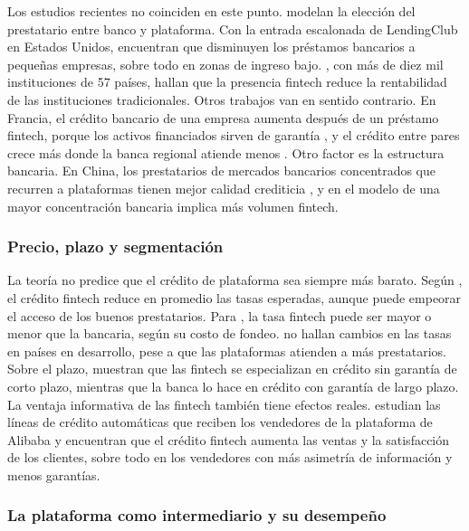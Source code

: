 Los estudios recientes no coinciden en este punto. \textcite{kim2026} modelan la elección del prestatario entre banco y plataforma. Con la entrada escalonada de LendingClub en Estados Unidos, encuentran que disminuyen los préstamos bancarios a pequeñas empresas, sobre todo en zonas de ingreso bajo. \textcite{bennaceur2026}, con más de diez mil instituciones de 57 países, hallan que la presencia fintech reduce la rentabilidad de las instituciones tradicionales. Otros trabajos van en sentido contrario. En Francia, el crédito bancario de una empresa aumenta después de un préstamo fintech, porque los activos financiados sirven de garantía \parencite{beaumont2026}, y el crédito entre pares crece más donde la banca regional atiende menos \parencite{eid2024}. Otro factor es la estructura bancaria. En China, los prestatarios de mercados bancarios concentrados que recurren a plataformas tienen mejor calidad crediticia \parencite{ma2023}, y en el modelo de \textcite{vives2025} una mayor concentración bancaria implica más volumen fintech.

\subsubsection{Precio, plazo y segmentación}

La teoría no predice que el crédito de plataforma sea siempre más barato. Según \textcite{chu2024}, el crédito fintech reduce en promedio las tasas esperadas, aunque puede empeorar el acceso de los buenos prestatarios. Para \textcite{vives2025}, la tasa fintech puede ser mayor o menor que la bancaria, según su costo de fondeo. \textcite{fareed2025} no hallan cambios en las tasas en países en desarrollo, pese a que las plataformas atienden a más prestatarios. Sobre el plazo, \textcite{serfes2025} muestran que las fintech se especializan en crédito sin garantía de corto plazo, mientras que la banca lo hace en crédito con garantía de largo plazo. La ventaja informativa de las fintech también tiene efectos reales. \textcite{hau2024} estudian las líneas de crédito automáticas que reciben los vendedores de la plataforma de Alibaba y encuentran que el crédito fintech aumenta las ventas y la satisfacción de los clientes, sobre todo en los vendedores con más asimetría de información y menos garantías.

\subsubsection{La plataforma como intermediario y su desempeño}

